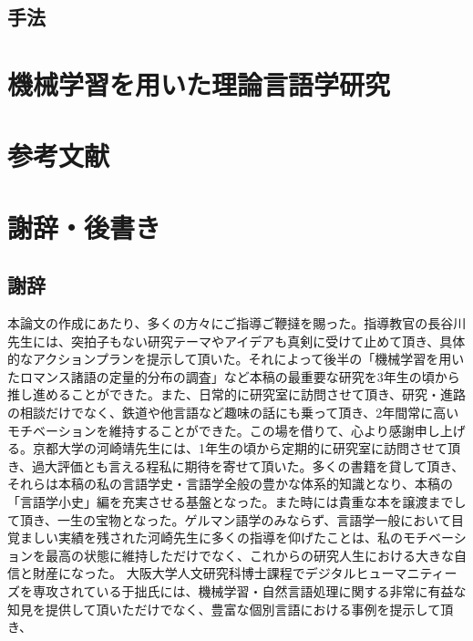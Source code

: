 \documentclass[12pt, oneside]{book} %
\begin{document}
\chapter{手法}
\part{機械学習を用いた理論言語学研究}
\part{参考文献}
\part{謝辞・後書き}
\chapter{謝辞}
本論文の作成にあたり、多くの方々にご指導ご鞭撻を賜った。指導教官の長谷川先生には、突拍子もない研究テーマやアイデアも真剣に受けて止めて頂き、具体的なアクションプランを提示して頂いた。それによって後半の「機械学習を用いたロマンス諸語の定量的分布の調査」など本稿の最重要な研究を3年生の頃から推し進めることができた。また、日常的に研究室に訪問させて頂き、研究・進路の相談だけでなく、鉄道や他言語など趣味の話にも乗って頂き、2年間常に高いモチベーションを維持することができた。この場を借りて、心より感謝申し上げる。京都大学の河崎靖先生には、1年生の頃から定期的に研究室に訪問させて頂き、過大評価とも言える程私に期待を寄せて頂いた。多くの書籍を貸して頂き、それらは本稿の私の言語学史・言語学全般の豊かな体系的知識となり、本稿の「言語学小史」編を充実させる基盤となった。また時には貴重な本を譲渡までして頂き、一生の宝物となった。ゲルマン語学のみならず、言語学一般において目覚ましい実績を残された河崎先生に多くの指導を仰げたことは、私のモチベーションを最高の状態に維持しただけでなく、これからの研究人生における大きな自信と財産になった。
大阪大学人文研究科博士課程でデジタルヒューマニティーズを専攻されている于拙氏には、機械学習・自然言語処理に関する非常に有益な知見を提供して頂いただけでなく、豊富な個別言語における事例を提示して頂き、
\backmatter

 
\end{document}
